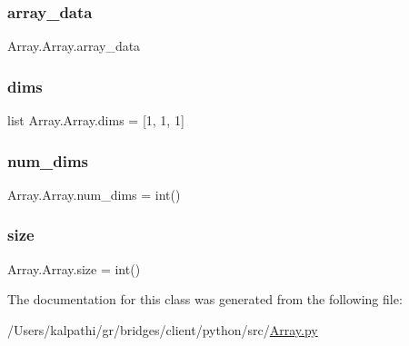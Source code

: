 \hypertarget{class_array_1_1_array_a75d2d3965f5232a430b069c8cce78d80}{}\label{class_array_1_1_array_a75d2d3965f5232a430b069c8cce78d80} 
\subsubsection{\texorpdfstring{array\+\_\+data}{array\_data}\hspace{0.1cm}{\footnotesize\ttfamily [2/2]}}
{\footnotesize\ttfamily Array.\+Array.\+array\+\_\+data}

\hypertarget{class_array_1_1_array_ab0f0de822ea2ff937cbfbcf64081ff11}{}\label{class_array_1_1_array_ab0f0de822ea2ff937cbfbcf64081ff11} 
\subsubsection{\texorpdfstring{dims}{dims}}
{\footnotesize\ttfamily list Array.\+Array.\+dims = \mbox{[}1, 1, 1\mbox{]}\hspace{0.3cm}{\ttfamily [static]}}

\hypertarget{class_array_1_1_array_ad20e83f196d6ccc482e3d49adaeaaf71}{}\label{class_array_1_1_array_ad20e83f196d6ccc482e3d49adaeaaf71} 
\subsubsection{\texorpdfstring{num\+\_\+dims}{num\_dims}}
{\footnotesize\ttfamily Array.\+Array.\+num\+\_\+dims = int()\hspace{0.3cm}{\ttfamily [static]}}

\hypertarget{class_array_1_1_array_a421362e43ac706de326ea5442db7116b}{}\label{class_array_1_1_array_a421362e43ac706de326ea5442db7116b} 
\subsubsection{\texorpdfstring{size}{size}}
{\footnotesize\ttfamily Array.\+Array.\+size = int()\hspace{0.3cm}{\ttfamily [static]}}



The documentation for this class was generated from the following file\+:\begin{DoxyCompactItemize}
\item 
/\+Users/kalpathi/gr/bridges/client/python/src/\hyperlink{_array_8py}{Array.\+py}\end{DoxyCompactItemize}
